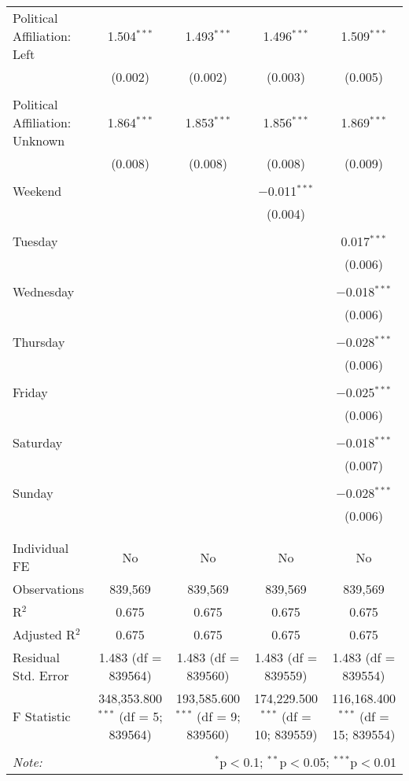 \documentclass[
]{article}
\begin{document}
\begin{table}[!htbp]
{\begin{tabular}{@{\extracolsep{5pt}}lcccc}
 Political Affiliation: Left & 1.504$^{***}$ & 1.493$^{***}$ & 1.496$^{***}$ & 1.509$^{***}$ \\ 
  & (0.002) & (0.002) & (0.003) & (0.005) \\ 
  & & & & \\ 
 Political Affiliation: Unknown & 1.864$^{***}$ & 1.853$^{***}$ & 1.856$^{***}$ & 1.869$^{***}$ \\ 
  & (0.008) & (0.008) & (0.008) & (0.009) \\ 
  & & & & \\ 
 Weekend &  &  & $-$0.011$^{***}$ &  \\ 
  &  &  & (0.004) &  \\ 
  & & & & \\ 
 Tuesday &  &  &  & 0.017$^{***}$ \\ 
  &  &  &  & (0.006) \\ 
  & & & & \\ 
 Wednesday &  &  &  & $-$0.018$^{***}$ \\ 
  &  &  &  & (0.006) \\ 
  & & & & \\ 
 Thursday &  &  &  & $-$0.028$^{***}$ \\ 
  &  &  &  & (0.006) \\ 
  & & & & \\ 
 Friday &  &  &  & $-$0.025$^{***}$ \\ 
  &  &  &  & (0.006) \\ 
  & & & & \\ 
 Saturday &  &  &  & $-$0.018$^{***}$ \\ 
  &  &  &  & (0.007) \\ 
  & & & & \\ 
 Sunday &  &  &  & $-$0.028$^{***}$ \\ 
  &  &  &  & (0.006) \\ 
  & & & & \\ 
\hline \\[-1.8ex] 
Individual FE & No & No & No & No \\ 
Observations & 839,569 & 839,569 & 839,569 & 839,569 \\ 
R$^{2}$ & 0.675 & 0.675 & 0.675 & 0.675 \\ 
Adjusted R$^{2}$ & 0.675 & 0.675 & 0.675 & 0.675 \\ 
Residual Std. Error & 1.483 (df = 839564) & 1.483 (df = 839560) & 1.483 (df = 839559) & 1.483 (df = 839554) \\ 
F Statistic & 348,353.800$^{***}$ (df = 5; 839564) & 193,585.600$^{***}$ (df = 9; 839560) & 174,229.500$^{***}$ (df = 10; 839559) & 116,168.400$^{***}$ (df = 15; 839554) \\ 
\hline 
\hline \\[-1.8ex] 
\textit{Note:}  & \multicolumn{4}{r}{$^{*}$p$<$0.1; $^{**}$p$<$0.05; $^{***}$p$<$0.01} \\ 
\end{tabular}
} 
\end{table} 
\newpage
\end{document}

